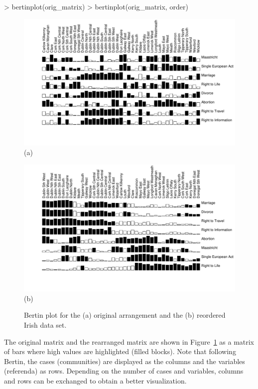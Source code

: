 \documentclass[fleqn, a4paper]{article}
\begin{document}
\begin{Schunk}
\begin{Sinput}
> bertinplot(orig_matrix)
> bertinplot(orig_matrix, order)
\end{Sinput}
\end{Schunk}
\begin{figure}
    \centering
    \includegraphics[width=15cm, trim=60 60 0 0]{seriation-bertin1} \\
    (a)
    
    \includegraphics[width=15cm, trim=60 60 0 0]{seriation-bertin2} \\
    (b)    
    \caption{Bertin plot for the (a) original arrangement and the (b) 
    reordered Irish data set.}
    \label{fig:bertin}
\end{figure}



The original matrix and the rearranged matrix are shown in
Figure~\ref{fig:bertin} as a matrix of bars where high values are highlighted
(filled blocks).  Note that following Bertin, the cases (communities) are
displayed as the columns and the variables (referenda) as rows.  Depending on
the number of cases and variables, columns and rows can be exchanged to obtain
a better visualization.
\end{document}
